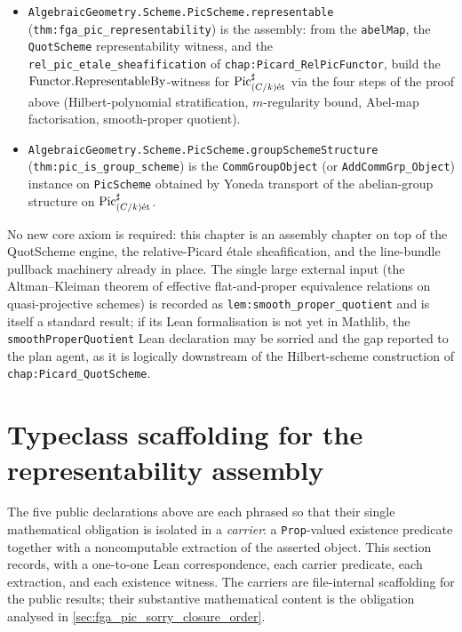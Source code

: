 \begin{itemize}
  \item \texttt{AlgebraicGeometry.Scheme.PicScheme.representable}
    (\texttt{thm:fga_pic_representability}) is the assembly: from the
    \texttt{abelMap}, the \texttt{QuotScheme} representability witness,
    and the \texttt{rel\_pic\_etale\_sheafification} of
    \texttt{chap:Picard_RelPicFunctor}, build the
    \(\mathrm{Functor}.\mathrm{RepresentableBy}\)-witness for
    \(\operatorname{Pic}^\sharp_{(C/k)\mathrm{\acute{e}t}}\) via the four steps of the proof above
    (Hilbert-polynomial stratification, \(m\)-regularity bound, Abel-map
    factorisation, smooth-proper quotient).
  \item \texttt{AlgebraicGeometry.Scheme.PicScheme.groupSchemeStructure}
    (\texttt{thm:pic_is_group_scheme}) is the
    \texttt{CommGroupObject} (or
    \texttt{AddCommGrp\_Object}) instance on \texttt{PicScheme} obtained
    by Yoneda transport of the abelian-group structure on
    \(\operatorname{Pic}^\sharp_{(C/k)\mathrm{\acute{e}t}}\).
\end{itemize}

No new core axiom is required: this chapter is an assembly chapter on
top of the QuotScheme engine, the relative-Picard \'etale sheafification,
and the line-bundle pullback machinery already in place. The single
large external input (the Altman--Kleiman theorem of effective
flat-and-proper equivalence relations on quasi-projective schemes) is
recorded as \texttt{lem:smooth_proper_quotient} and is itself a standard
result; if its Lean formalisation is not yet in Mathlib, the
\texttt{smoothProperQuotient} Lean declaration may be sorried and the
gap reported to the plan agent, as it is logically downstream of the
Hilbert-scheme construction of \texttt{chap:Picard_QuotScheme}.

\section{Typeclass scaffolding for the representability assembly}
\label{sec:fga_pic_typeclass_scaffolding}

The five public declarations above are each phrased so that their single
mathematical obligation is isolated in a \emph{carrier}: a \texttt{Prop}-valued
existence predicate together with a noncomputable extraction of the asserted
object. This section records, with a one-to-one Lean correspondence, each
carrier predicate, each extraction, and each existence witness. The carriers
are file-internal scaffolding for the public results; their substantive
mathematical content is the obligation analysed in
\cref{sec:fga_pic_sorry_closure_order}.

